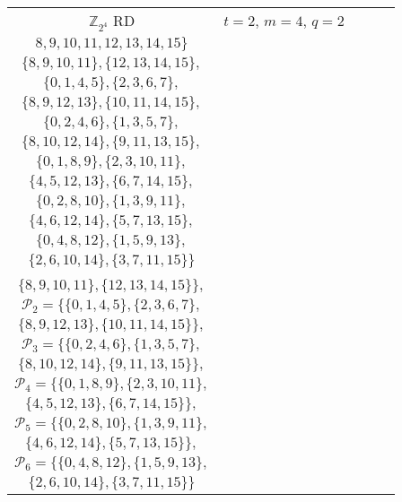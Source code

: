 \documentclass[conference]{IEEEtran}
\begin{document}
\begin{table*}[h]
\begin{center}
\begin{tabular}{|c|c|c|c|c|}
			$\mathbb{Z}_{2^4}$ RD & $t = 2$, $m = 4$, $q = 2$ & \makecell{	$\{ 0, 1, 2, 3, 4, 5, 6, 7,$\\
				$ 8, 9, 10, 11, 12, 13, 14, 15\}$} &  \makecell{$\{\{0,1,2,3\}, \{4,5,6,7\},$\\$ \{8,9,10,11\}, \{12,13,14,15\},$\\
				$\{0,1,4,5\},\{2,3,6,7\},$\\$\{8,9,12,13\}, \{10,11,14,15\},$\\
				$\{0,2,4,6\}, \{1,3,5,7\},$\\$ \{8,10,12,14\},\{9,11,13,15\},$\\	
				$\{0,1,8,9\},\{2,3,10,11\},$\\$\{4,5,12,13\}, \{6,7,14,15\},$\\
				$\{0,2,8,10\},\{1,3,9,11\},$\\$\{4,6,12,14\}, \{5,7,13,15\},$\\
				$\{0,4,8,12\},\{1,5,9,13\},$\\$\{2,6,10,14\}, \{3,7,11,15\}\}$\\}& \makecell{  $\mathcal{P}_1 = \{\{0,1,2,3\}, \{4,5,6,7\},$\\$ \{8,9,10,11\}, \{12,13,14,15\}\},$\\
				$\mathcal{P}_2 = \{\{0,1,4,5\},\{2,3,6,7\} ,$\\$\{8,9,12,13\}, \{10,11,14,15\}\},$\\
				$\mathcal{P}_3 = \{\{0,2,4,6\}, \{1,3,5,7\},$\\$ \{8,10,12,14\},\{9,11,13,15\}\},$\\
				$\mathcal{P}_4 = \{\{0,1,8,9\},\{2,3,10,11\} ,$\\$\{4,5,12,13\}, \{6,7,14,15\}\},$\\
				$\mathcal{P}_5 = \{\{0,2,8,10\},\{1,3,9,11\} ,$\\$\{4,6,12,14\}, \{5,7,13,15\}\},$\\
				$\mathcal{P}_6 = \{\{0,4,8,12\},\{1,5,9,13\} ,$\\$\{2,6,10,14\}, \{3,7,11,15\}\}$}\\
			\hline
			

\end{tabular}
\end{center}
\end{table*}
\end{document}
